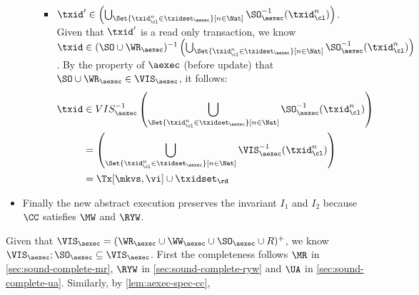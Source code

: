 \begin{itemize}
\begin{itemize}
\begin{itemize}
            \item \( \txid' \in  \left( \bigcup_{\Set{\txid_{\cl}^{n} \in \txidset_{\aexec} }[ n \in \Nat ]} \SO_{\aexec}^{-1}(\txid^n_\cl) \right) \).
                Given that \( \txid' \) is a read only transaction, we know \( \txid \in (\SO \cup \WR_\aexec)^{-1} \left( \bigcup_{\Set{\txid_{\cl}^{n} \in \txidset_{\aexec} }[ n \in \Nat ]} \SO_{\aexec}^{-1}(\txid^n_\cl) \right) \).
                By the property of \( \aexec \) (before update) that \( \SO \cup \WR_\aexec \in \VIS_\aexec \),
                it follows:
                \begin{align*}
                    \txid & \in VIS_\aexec^{-1} \left( \bigcup_{\Set{\txid_{\cl}^{n} \in \txidset_{\aexec} }[ n \in \Nat ]} \SO_{\aexec}^{-1}(\txid^n_\cl) \right) \\
                          & = \left( \bigcup_{\Set{\txid_{\cl}^{n} \in \txidset_{\aexec} }[ n \in \Nat ]} \VIS_{\aexec}^{-1}(\txid^n_\cl) \right)  \\
                          & = \Tx[\mkvs,\vi] \cup \txidset_\rd
                \end{align*}
                
        \end{itemize}
    \end{itemize}
\item Finally the new abstract execution preserves the invariant \( I_1 \) and \( I_2 \) 
because  \( \CC \) satisfies \( \MW \) and \( \RYW \).
\end{itemize}

Given that \( \VIS_\aexec = (\WR_\aexec \cup \WW_\aexec \cup \SO_\aexec \cup R)^{+} \),
we know \( \VIS_\aexec ; \SO_\aexec \subseteq \VIS_\aexec \).
First the completeness follows \( \MR \) in \cref{sec:sound-complete-mr}, \( \RYW \) in \cref{sec:sound-complete-ryw} and  \( \UA \) in \cref{sec:sound-complete-ua}.
Similarly, by \cref{lem:aexec-spec-cc},
